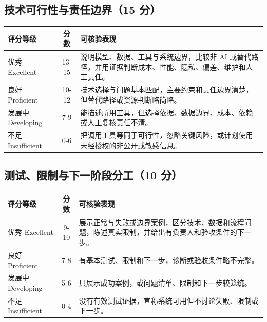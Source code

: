 \documentclass[11pt]{article}
\newcommand{\formaltable}{%
  \small
  \setlength{\tabcolsep}{5pt}%
  \renewcommand{\arraystretch}{1.2}%
  \setlength{\arrayrulewidth}{0.4pt}%
}
\renewcommand{\arraystretch}{1.2}
\begin{document}
\subsection{技术可行性与责任边界（15 分）}
\begin{center}
\formaltable
\begin{tabularx}{\textwidth}{|l|c|Y|}
\hline
\textbf{评分等级} & \textbf{分数} & \textbf{可核验表现} \\ \hline
优秀 Excellent & 13-15 & 说明模型、数据、工具与系统边界，比较非 AI 或替代路径，并用证据判断成本、性能、隐私、偏差、维护和人工责任。 \\ \hline
良好 Proficient & 10-12 & 技术选择与问题基本匹配，主要约束和责任边界清楚，但替代路径或资源判断略简略。 \\ \hline
发展中 Developing & 7-9 & 能描述所用工具，但选择依据、数据边界、成本、依赖或人工复核责任不清。 \\ \hline
不足 Insufficient & 0-6 & 把调用工具等同于可行性，忽略关键风险，或计划使用未经授权的非公开或敏感信息。 \\ \hline
\end{tabularx}
\end{center}

\subsection{测试、限制与下一阶段分工（10 分）}
\begin{center}
\formaltable
\begin{tabularx}{\textwidth}{|l|c|Y|}
\hline
\textbf{评分等级} & \textbf{分数} & \textbf{可核验表现} \\ \hline
优秀 Excellent & 9-10 & 展示正常与失败或边界案例，区分技术、数据和流程问题，陈述真实限制，并给出有负责人和验收条件的下一步。 \\ \hline
良好 Proficient & 7-8 & 有基本测试、限制和下一步，诊断或验收条件略不完整。 \\ \hline
发展中 Developing & 5-6 & 只展示成功案例，或问题清单、限制和下一步较笼统。 \\ \hline
不足 Insufficient & 0-4 & 没有有效测试证据，宣称系统可用但不讨论失败、限制或下一步。 \\ \hline
\end{tabularx}
\end{center}
\end{document}
